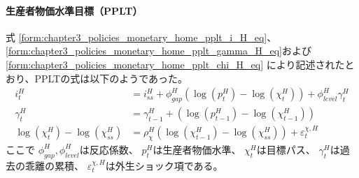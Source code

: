 \paragraph{生産者物価水準目標（PPLT）}
\label{sec:chapter5_beta_shock_policies_pplt}
式
\eqref{form:chapter3_policies_monetary_home_pplt_i_H_eq}、
\eqref{form:chapter3_policies_monetary_home_pplt_gamma_H_eq}および
\eqref{form:chapter3_policies_monetary_home_pplt_chi_H_eq}
により記述されたとおり、PPLTの式は以下のようであった。
\begin{align}
\label{form:chapter5_beta_shock_policies_pplt_i_H_eq}
    i_t^H&=i_{ss}^H+\phi_{gap}^H(\log(p_t^H)-\log(\chi_t^H))+\phi_{level}^H\gamma_t^H \\
\label{form:chapter5_beta_shock_policies_pplt_gamma_H_eq}
    \gamma_t^H&=\gamma_{t-1}^H+(\log(p_{t-1}^H)-\log(\chi_{t-1}^H)) \\
\label{form:chapter5_beta_shock_policies_pplt_chi_H_eq}
    \log(\chi_t^H)-\log(\chi_{ss}^H)&=\rho_{\chi}^H\left(\log(\chi_{t-1}^H)-\log(\chi_{ss}^H)\right)+\varepsilon_t^{\chi,H}
\end{align}
ここで
\(\phi_{gap}^H, \phi_{level}^H\)は反応係数、
\(p_t^H\)は生産者物価水準、
\(\chi_t^H\)は目標パス、
\(\gamma_t^H\)は過去の乖離の累積、
\(\varepsilon_t^{\chi,H}\)は外生ショック項である。
